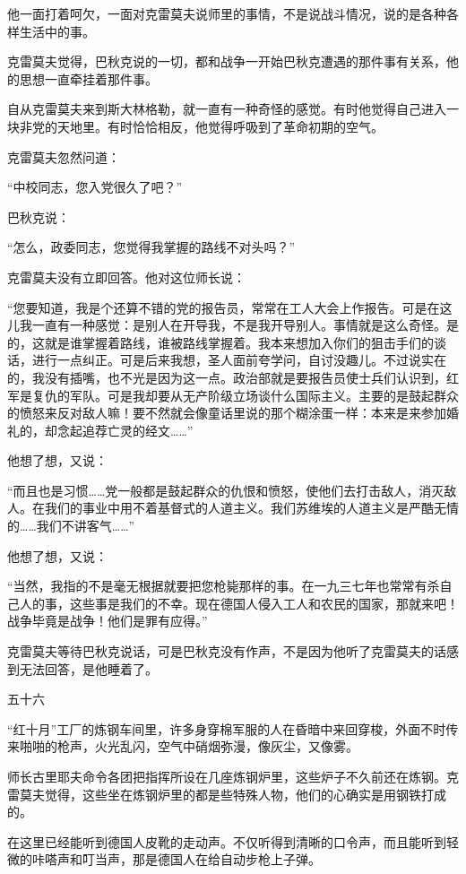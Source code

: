 他一面打着呵欠，一面对克雷莫夫说师里的事情，不是说战斗情况，说的是各种各样生活中的事。

克雷莫夫觉得，巴秋克说的一切，都和战争一开始巴秋克遭遇的那件事有关系，他的思想一直牵挂着那件事。

自从克雷莫夫来到斯大林格勒，就一直有一种奇怪的感觉。有时他觉得自己进入一块非党的天地里。有时恰恰相反，他觉得呼吸到了革命初期的空气。

克雷莫夫忽然问道：

“中校同志，您入党很久了吧？”

巴秋克说：

“怎么，政委同志，您觉得我掌握的路线不对头吗？”

克雷莫夫没有立即回答。他对这位师长说：

“您要知道，我是个还算不错的党的报告员，常常在工人大会上作报告。可是在这儿我一直有一种感觉：是别人在开导我，不是我开导别人。事情就是这么奇怪。是的，这就是谁掌握着路线，谁被路线掌握着。我本来想加入你们的狙击手们的谈话，进行一点纠正。可是后来我想，圣人面前夸学问，自讨没趣儿。不过说实在的，我没有插嘴，也不光是因为这一点。政治部就是要报告员使士兵们认识到，红军是复仇的军队。可是我却要从无产阶级立场谈什么国际主义。主要的是鼓起群众的愤怒来反对敌人嘛！要不然就会像童话里说的那个糊涂蛋一样：本来是来参加婚礼的，却念起追荐亡灵的经文……”

他想了想，又说：

“而且也是习惯……党一般都是鼓起群众的仇恨和愤怒，使他们去打击敌人，消灭敌人。在我们的事业中用不着基督式的人道主义。我们苏维埃的人道主义是严酷无情的……我们不讲客气……”

他想了想，又说：

“当然，我指的不是毫无根据就要把您枪毙那样的事。在一九三七年也常常有杀自己人的事，这些事是我们的不幸。现在德国人侵入工人和农民的国家，那就来吧！战争毕竟是战争！他们是罪有应得。”

克雷莫夫等待巴秋克说话，可是巴秋克没有作声，不是因为他听了克雷莫夫的话感到无法回答，是他睡着了。

五十六

“红十月”工厂的炼钢车间里，许多身穿棉军服的人在昏暗中来回穿梭，外面不时传来啪啪的枪声，火光乱闪，空气中硝烟弥漫，像灰尘，又像雾。

师长古里耶夫命令各团把指挥所设在几座炼钢炉里，这些炉子不久前还在炼钢。克雷莫夫觉得，这些坐在炼钢炉里的都是些特殊人物，他们的心确实是用钢铁打成的。

在这里已经能听到德国人皮靴的走动声。不仅听得到清晰的口令声，而且能听到轻微的咔嗒声和叮当声，那是德国人在给自动步枪上子弹。

